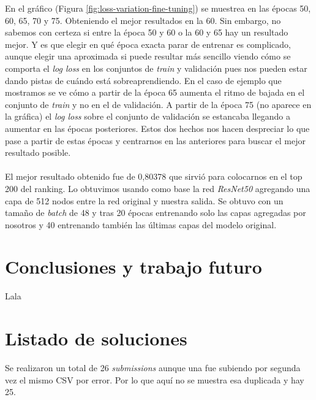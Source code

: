 En el gráfico (Figura \ref{fig:loss-variation-fine-tuning}) se muestrea en las épocas 50, 60, 65, 70 y 75. Obteniendo el mejor resultados en la 60. Sin embargo, no sabemos con certeza si entre la época 50 y 60 o la 60 y 65 hay un resultado mejor. Y es que elegir en qué época exacta parar de entrenar es complicado, aunque elegir una aproximada si puede resultar más sencillo viendo cómo se comporta el \textit{log loss} en los conjuntos de \textit{train} y validación pues nos pueden estar dando pistas de cuándo está sobreaprendiendo. En el caso de ejemplo que mostramos se ve cómo a partir de la época 65 aumenta el ritmo de bajada en el conjunto de \textit{train} y no en el de validación. A partir de la época 75 (no aparece en la gráfica) el \textit{log loss} sobre el conjunto de validación se estancaba llegando a aumentar en las épocas posteriores. Estos dos hechos nos hacen despreciar lo que pase a partir de estas épocas y centrarnos en las anteriores para buscar el mejor resultado posible.
\\ \\
El mejor resultado obtenido fue de 0,80378 que sirvió para colocarnos en el top 200 del ranking. Lo obtuvimos usando como base la red \textit{ResNet50} agregando una capa de 512 nodos entre la red original y nuestra salida. Se obtuvo con un tamaño de \textit{batch} de 48 y tras 20 épocas entrenando solo las capas agregadas por nosotros y 40 entrenando también las últimas capas del modelo original.

\section{Conclusiones y trabajo futuro}

Lala

\section{Listado de soluciones}

Se realizaron un total de 26 \textit{submissions} aunque una fue subiendo por segunda vez el mismo CSV por error. Por lo que aquí no se  muestra esa duplicada y hay 25.


